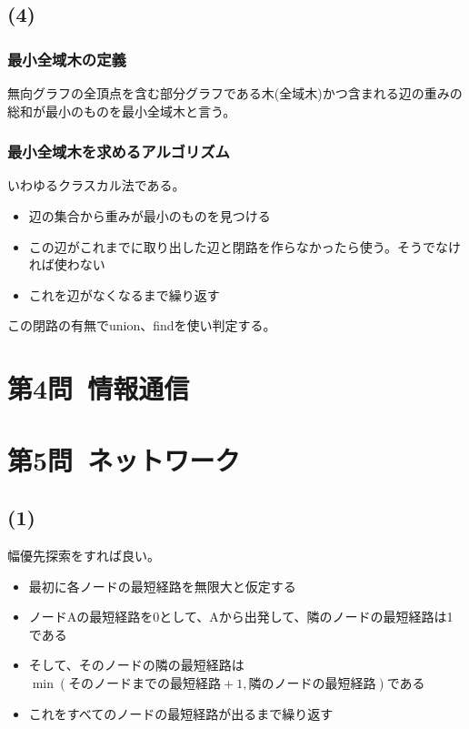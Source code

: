 \documentclass[a4paper,12pt,xelatex,ja=standard]{bxjsarticle}
\begin{document}
\subsection*{(4)}
\subsubsection*{最小全域木の定義}
無向グラフの全頂点を含む部分グラフである木(全域木)かつ含まれる辺の重みの総和が最小のものを最小全域木と言う。

\subsubsection*{最小全域木を求めるアルゴリズム}
いわゆるクラスカル法である。
\begin{itemize}
  \item 辺の集合から重みが最小のものを見つける
  \item この辺がこれまでに取り出した辺と閉路を作らなかったら使う。そうでなければ使わない
  \item これを辺がなくなるまで繰り返す
\end{itemize}

この閉路の有無でunion、findを使い判定する。

\section*{第4問\ 情報通信}

\section*{第5問\ ネットワーク}
\subsection*{(1)}
幅優先探索をすれば良い。
\begin{itemize}
  \item 最初に各ノードの最短経路を無限大と仮定する
  \item ノードAの最短経路を0として、Aから出発して、隣のノードの最短経路は1である
  \item そして、そのノードの隣の最短経路は$\min(\text{そのノードまでの最短経路} + 1, \text{隣のノードの最短経路})$である
  \item これをすべてのノードの最短経路が出るまで繰り返す
\end{itemize}
\end{document}

